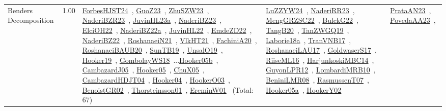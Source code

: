 {\begin{longtable}{p{3cm}r>{\raggedright\arraybackslash}p{6cm}>{\raggedright\arraybackslash}p{6cm}>{\raggedright\arraybackslash}p{8cm}}
\index{Benders Decomposition}\index{Concepts!Benders Decomposition}Benders Decomposition &  1.00 & \href{../works/ForbesHJST24.pdf}{ForbesHJST24}~\cite{ForbesHJST24}, \href{../works/GuoZ23.pdf}{GuoZ23}~\cite{GuoZ23}, \href{../works/ZhuSZW23.pdf}{ZhuSZW23}~\cite{ZhuSZW23}, \href{../works/NaderiBZR23.pdf}{NaderiBZR23}~\cite{NaderiBZR23}, \href{../works/JuvinHL23a.pdf}{JuvinHL23a}~\cite{JuvinHL23a}, \href{../works/NaderiBZ23.pdf}{NaderiBZ23}~\cite{NaderiBZ23}, \href{../works/ElciOH22.pdf}{ElciOH22}~\cite{ElciOH22}, \href{../works/NaderiBZ22a.pdf}{NaderiBZ22a}~\cite{NaderiBZ22a}, \href{../works/JuvinHL22.pdf}{JuvinHL22}~\cite{JuvinHL22}, \href{../works/EmdeZD22.pdf}{EmdeZD22}~\cite{EmdeZD22}, \href{../works/NaderiBZ22.pdf}{NaderiBZ22}~\cite{NaderiBZ22}, \href{../works/RoshanaeiN21.pdf}{RoshanaeiN21}~\cite{RoshanaeiN21}, \href{../works/VlkHT21.pdf}{VlkHT21}~\cite{VlkHT21}, \href{../works/FachiniA20.pdf}{FachiniA20}~\cite{FachiniA20}, \href{../works/RoshanaeiBAUB20.pdf}{RoshanaeiBAUB20}~\cite{RoshanaeiBAUB20}, \href{../works/SunTB19.pdf}{SunTB19}~\cite{SunTB19}, \href{../works/UnsalO19.pdf}{UnsalO19}~\cite{UnsalO19}, \href{../works/Hooker19.pdf}{Hooker19}~\cite{Hooker19}, \href{../works/GombolayWS18.pdf}{GombolayWS18}~\cite{GombolayWS18}...\href{../works/Hooker05b.pdf}{Hooker05b}~\cite{Hooker05b}, \href{../works/CambazardJ05.pdf}{CambazardJ05}~\cite{CambazardJ05}, \href{../works/Hooker05.pdf}{Hooker05}~\cite{Hooker05}, \href{../works/ChuX05.pdf}{ChuX05}~\cite{ChuX05}, \href{../works/CambazardHDJT04.pdf}{CambazardHDJT04}~\cite{CambazardHDJT04}, \href{../works/Hooker04.pdf}{Hooker04}~\cite{Hooker04}, \href{../works/HookerO03.pdf}{HookerO03}~\cite{HookerO03}, \href{../works/BenoistGR02.pdf}{BenoistGR02}~\cite{BenoistGR02}, \href{../works/Thorsteinsson01.pdf}{Thorsteinsson01}~\cite{Thorsteinsson01}, \href{../works/EreminW01.pdf}{EreminW01}~\cite{EreminW01} (Total: 67) & \href{../works/LuZZYW24.pdf}{LuZZYW24}~\cite{LuZZYW24}, \href{../works/NaderiRR23.pdf}{NaderiRR23}~\cite{NaderiRR23}, \href{../works/MengGRZSC22.pdf}{MengGRZSC22}~\cite{MengGRZSC22}, \href{../works/BulckG22.pdf}{BulckG22}~\cite{BulckG22}, \href{../works/TangB20.pdf}{TangB20}~\cite{TangB20}, \href{../works/TanZWGQ19.pdf}{TanZWGQ19}~\cite{TanZWGQ19}, \href{../works/Laborie18a.pdf}{Laborie18a}~\cite{Laborie18a}, \href{../works/TranVNB17.pdf}{TranVNB17}~\cite{TranVNB17}, \href{../works/RoshanaeiLAU17.pdf}{RoshanaeiLAU17}~\cite{RoshanaeiLAU17}, \href{../works/GoldwaserS17.pdf}{GoldwaserS17}~\cite{GoldwaserS17}, \href{../works/RiiseML16.pdf}{RiiseML16}~\cite{RiiseML16}, \href{../works/HarjunkoskiMBC14.pdf}{HarjunkoskiMBC14}~\cite{HarjunkoskiMBC14}, \href{../works/GuyonLPR12.pdf}{GuyonLPR12}~\cite{GuyonLPR12}, \href{../works/LombardiMRB10.pdf}{LombardiMRB10}~\cite{LombardiMRB10}, \href{../works/BeniniLMR08.pdf}{BeniniLMR08}~\cite{BeniniLMR08}, \href{../works/RasmussenT07.pdf}{RasmussenT07}~\cite{RasmussenT07}, \href{../works/Hooker05a.pdf}{Hooker05a}~\cite{Hooker05a}, \href{../works/HookerY02.pdf}{HookerY02}~\cite{HookerY02} & \href{../works/PrataAN23.pdf}{PrataAN23}~\cite{PrataAN23}, \href{../works/PovedaAA23.pdf}{PovedaAA23}~\cite{PovedaAA23}, 
\end{longtable}}
